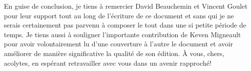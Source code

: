
En guise de conclusion, je tiens à remercier David Beauchemin et Vincent Goulet pour leur support tout au long de l'écriture de ce document et sans qui je ne serais certainement pas parvenu à composer le tout dans une si petite période de temps. Je tiens aussi à souligner l'importante contribution de Keven Migneault pour avoir volontairement lu d'une couverture à l'autre le document et avoir améliorer de manière significative la qualité de son édition. À vous, chers, acolytes, en espérant retravailler avec vous dans un avenir rapproché!